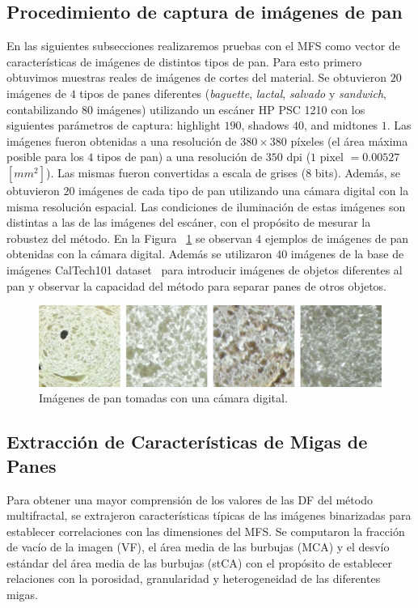 \subsection{Procedimiento de captura de imágenes de pan}
En las siguientes subsecciones realizaremos pruebas con el MFS como vector de características de imágenes de distintos tipos de pan.
Para esto primero obtuvimos muestras reales de imágenes de cortes del material.
Se obtuvieron $20$ imágenes de $4$ tipos de panes diferentes ({\em baguette}, {\em lactal}, {\em salvado} y {\em sandwich}, contabilizando $80$ imágenes) utilizando un escáner HP PSC 1210 con los siguientes parámetros de captura:  highlight $190$, shadows $40$, and midtones $1$.
Las imágenes fueron obtenidas a una resolución de $380\times 380$ píxeles (el área máxima posible para los $4$ tipos de pan) a una resolución de $350$ dpi ($1$ pixel $= 0.00527$ $[mm^{2}]$).
Las mismas fueron convertidas a escala de grises ($8$ bits).
Además, se obtuvieron $20$ imágenes de cada tipo de pan utilizando una cámara digital con la misma resolución espacial.
Las condiciones de iluminación de estas imágenes son distintas a las de las imágenes del escáner, con el propósito de mesurar la robustez del método.
En la Figura ~\ref{fig:camera} se observan $4$ ejemplos de imágenes de pan obtenidas con la cámara digital. Además se utilizaron $40$ imágenes de la base de imágenes CalTech101 dataset~\cite{FeiFei04} para introducir imágenes de objetos diferentes al pan y observar la capacidad del método para separar panes de otros objetos.

\begin{figure}[h!]
\centering
\includegraphics[width=12cm]{figures/pancamara}
\caption{Imágenes de pan tomadas con una cámara digital.}
\label{fig:camera}
\end{figure}

\subsection{Extracción de Características de Migas de Panes}
Para obtener una mayor comprensión de los valores de las DF del método multifractal, se extrajeron características típicas de las imágenes binarizadas para establecer correlaciones con las dimensiones del MFS.
Se computaron la fracción de vacío de la imagen (\acrshort{VF}), el área media de las burbujas (\acrshort{MCA}) y el desvío estándar del área media de las burbujas (\acrshort{stCA}) con el propósito de establecer relaciones con la porosidad, granularidad y heterogeneidad de las diferentes migas.


